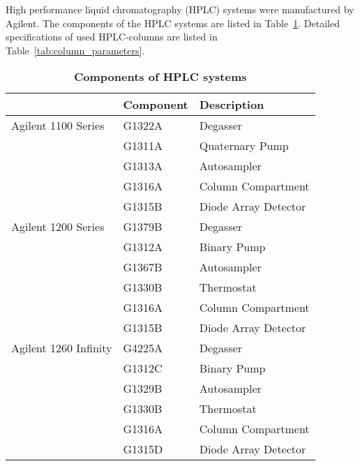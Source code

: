 
	High performance liquid chromatography (HPLC) systems were manufactured by Agilent.
	The components of the HPLC systems are listed in Table~\ref{tab:HPLCtab}.
	Detailed specifications of used HPLC-columns are listed in Table~\ref{tab:column_parameters}.

	\begin{table}[htbp]
		\caption[Components of HPLC systems]{%
			\textbf{Components of HPLC systems}}
		\label{tab:HPLCtab}
		\centering
		\begin{tabularx}{\textwidth}{XXX}
			\toprule
							& \textbf{Component}		& \textbf{Description}	\\
			\midrule
			Agilent 1100 Series		&	G1322A		&	Degasser			\\
									&	G1311A		&	Quaternary Pump		\\
									&	G1313A		&	Autosampler			\\
									&	G1316A		&	Column Compartment	\\
									&	G1315B		&	Diode Array Detector	\\
			\midrule
			Agilent 1200 Series		&	G1379B		&	Degasser			\\
									&	G1312A		&	Binary Pump			\\
									&	G1367B		&	Autosampler			\\
									&	G1330B		&	Thermostat			\\
									&	G1316A		&	Column Compartment	\\
									&	G1315B		&	Diode Array Detector	\\
			\midrule
			Agilent 1260 Infinity	&	G4225A		&	Degasser			\\
									&	G1312C		&	Binary Pump			\\
									&	G1329B		&	Autosampler			\\
									&	G1330B		&	Thermostat			\\
									&	G1316A		&	Column Compartment	\\
									&	G1315D		&	Diode Array Detector	\\
			\bottomrule
		\end{tabularx}
	\end{table}


